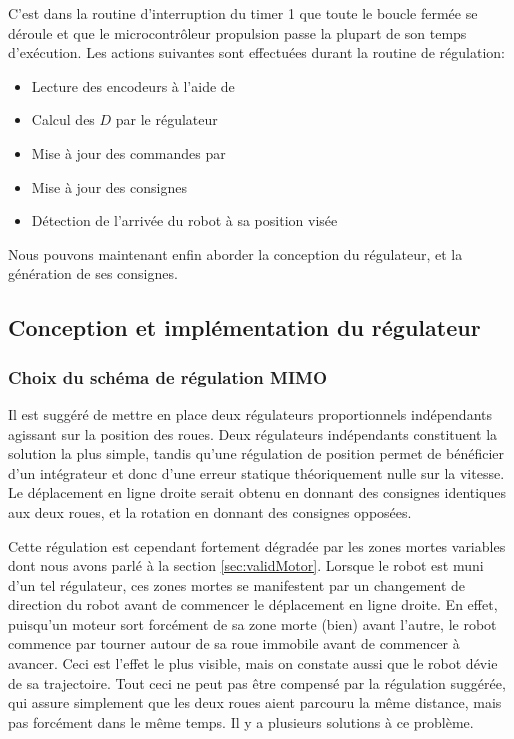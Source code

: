 C'est dans la routine d'interruption du timer 1 que toute le boucle fermée se déroule et que le microcontrôleur propulsion passe la plupart de son temps d'exécution. Les actions suivantes sont effectuées durant la routine de régulation:
\begin{itemize}
  \item Lecture des encodeurs à l'aide de 
  \item Calcul des $D$ par le régulateur
  \item Mise à jour des commandes par 
  \item Mise à jour des consignes
  \item Détection de l'arrivée du robot à sa position visée
\end{itemize}

Nous pouvons maintenant enfin aborder la conception du régulateur, et la génération de ses consignes.

\subsection{Conception et implémentation du régulateur}
\subsubsection{Choix du schéma de régulation MIMO}
Il est suggéré de mettre en place deux régulateurs proportionnels indépendants agissant sur la position des roues. Deux régulateurs indépendants constituent la solution la plus simple, tandis qu'une régulation de position permet de bénéficier d'un intégrateur et donc d'une erreur statique théoriquement nulle sur la vitesse. Le déplacement en ligne droite serait obtenu en donnant des consignes identiques aux deux roues, et la rotation en donnant des consignes opposées.

Cette régulation est cependant fortement dégradée par les zones mortes variables dont nous avons parlé à la section \ref{sec:validMotor}. Lorsque le robot est muni d'un tel régulateur, ces zones mortes se manifestent par un changement de direction du robot avant de commencer le déplacement en ligne droite. En effet, puisqu'un moteur sort forcément de sa zone morte (bien) avant l'autre, le robot commence par tourner autour de sa roue immobile avant de commencer à avancer. Ceci est l'effet le plus visible, mais on constate aussi que le robot dévie de sa trajectoire. Tout ceci ne peut pas être compensé par la régulation suggérée, qui assure simplement que les deux roues aient parcouru la même distance, mais pas forcément dans le même temps. Il y a plusieurs solutions à ce problème.

